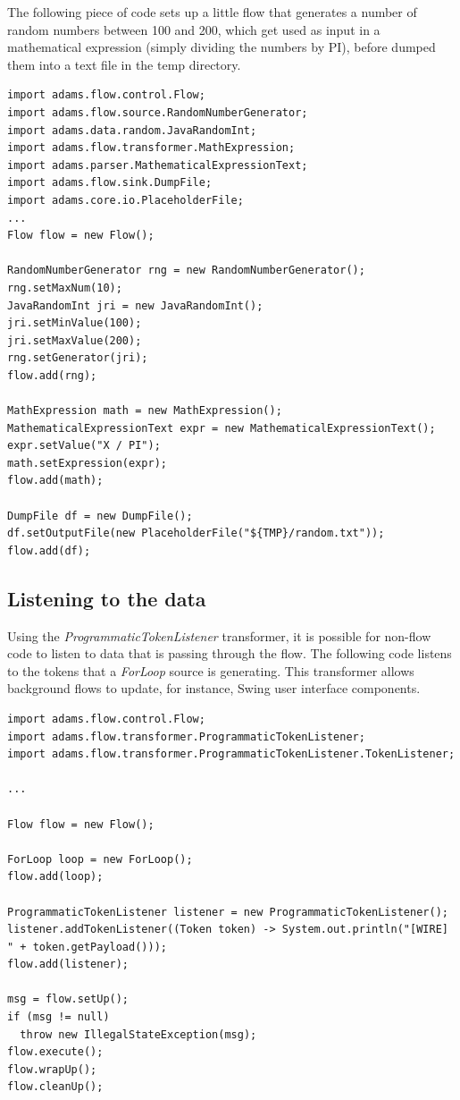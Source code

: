 The following piece of code sets up a little flow that generates a number
of random numbers between 100 and 200, which get used as input in a mathematical 
expression (simply dividing the numbers by PI), before dumped them into a 
text file in the temp directory.
\begin{verbatim}
import adams.flow.control.Flow;
import adams.flow.source.RandomNumberGenerator;
import adams.data.random.JavaRandomInt;
import adams.flow.transformer.MathExpression;
import adams.parser.MathematicalExpressionText;
import adams.flow.sink.DumpFile;
import adams.core.io.PlaceholderFile;
...
Flow flow = new Flow();

RandomNumberGenerator rng = new RandomNumberGenerator();
rng.setMaxNum(10);
JavaRandomInt jri = new JavaRandomInt();
jri.setMinValue(100);
jri.setMaxValue(200);
rng.setGenerator(jri);
flow.add(rng);

MathExpression math = new MathExpression();
MathematicalExpressionText expr = new MathematicalExpressionText();
expr.setValue("X / PI");
math.setExpression(expr);
flow.add(math);

DumpFile df = new DumpFile();
df.setOutputFile(new PlaceholderFile("${TMP}/random.txt"));
flow.add(df);
\end{verbatim}

\subsection{Listening to the data}
Using the \textit{ProgrammaticTokenListener} transformer, it is possible for
non-flow code to listen to data that is passing through the flow.
The following code listens to the tokens that a \textit{ForLoop} source
is generating. This transformer allows background flows to update, for instance,
Swing user interface components.

\begin{verbatim}
import adams.flow.control.Flow;
import adams.flow.transformer.ProgrammaticTokenListener;
import adams.flow.transformer.ProgrammaticTokenListener.TokenListener;

...

Flow flow = new Flow();

ForLoop loop = new ForLoop();
flow.add(loop);

ProgrammaticTokenListener listener = new ProgrammaticTokenListener();
listener.addTokenListener((Token token) -> System.out.println("[WIRE] " + token.getPayload()));
flow.add(listener);

msg = flow.setUp();
if (msg != null)
  throw new IllegalStateException(msg);
flow.execute();
flow.wrapUp();
flow.cleanUp();
\end{verbatim}

